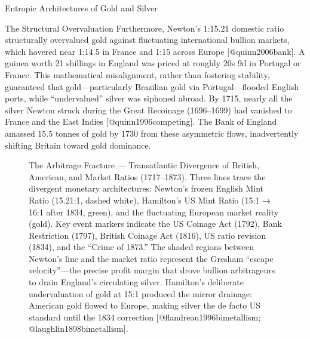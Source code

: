 \documentclass[
  ignorenonframetext,
]{beamer}
\makeatletter
\newcommand*\pandocbounded[1]{%
  \sbox\pandoc@box{#1}%
  \Gscale@div\@tempa{\textheight}{\dimexpr\ht\pandoc@box+\dp\pandoc@box\relax}%
  \Gscale@div\@tempb{\linewidth}{\wd\pandoc@box}%
  \ifdim\@tempb\p@<\@tempa\p@\let\@tempa\@tempb\fi%
  \ifdim\@tempa\p@<\p@\scalebox{\@tempa}{\usebox\pandoc@box}%
  \else\usebox{\pandoc@box}%
  \fi%
}
\makeatother
\begin{document}
\begin{frame}{Entropic Architectures of Gold and Silver}
\begin{block}{The Structural Overvaluation}
\protect{}\label{the-structural-overvaluation}
Furthermore, Newton's 1:15.21 domestic ratio structurally overvalued
gold against fluctuating international bullion markets, which hovered
near 1:14.5 in France and 1:15 across Europe {[}@quinn2006bank{]}. A
guinea worth 21 shillings in England was priced at roughly 20s 9d in
Portugal or France. This mathematical misalignment, rather than
fostering stability, guaranteed that gold---particularly Brazilian gold
via Portugal---flooded English ports, while ``undervalued'' silver was
siphoned abroad. By 1715, nearly all the silver Newton struck during the
Great Recoinage (1696--1699) had vanished to France and the East Indies
{[}@quinn1996competing{]}. The Bank of England amassed 15.5 tonnes of
gold by 1730 from these asymmetric flows, inadvertently shifting Britain
toward gold dominance.

\begin{figure}
\centering
\pandocbounded{\includegraphics[keepaspectratio,alt={The Arbitrage Fracture --- Transatlantic Divergence of British, American, and Market Ratios (1717--1873). Three lines trace the divergent monetary architectures: Newton's frozen English Mint Ratio (15.21:1, dashed white), Hamilton's US Mint Ratio (15:1 → 16:1 after 1834, green), and the fluctuating European market reality (gold). Key event markers indicate the US Coinage Act (1792), Bank Restriction (1797), British Coinage Act (1816), US ratio revision (1834), and the ``Crime of 1873.'' The shaded regions between Newton's line and the market ratio represent the Gresham ``escape velocity''---the precise profit margin that drove bullion arbitrageurs to drain England's circulating silver. Hamilton's deliberate undervaluation of gold at 15:1 produced the mirror drainage: American gold flowed to Europe, making silver the de facto US standard until the 1834 correction {[}@flandreau1996bimetallism; @laughlin1898bimetallism{]}.}]{../output/figures/historic_ratio.png}}
\caption{The Arbitrage Fracture --- Transatlantic Divergence of British,
American, and Market Ratios (1717--1873). Three lines trace the
divergent monetary architectures: Newton's frozen English Mint Ratio
(15.21:1, dashed white), Hamilton's US Mint Ratio (15:1 → 16:1 after
1834, green), and the fluctuating European market reality (gold). Key
event markers indicate the US Coinage Act (1792), Bank Restriction
(1797), British Coinage Act (1816), US ratio revision (1834), and the
``Crime of 1873.'' The shaded regions between Newton's line and the
market ratio represent the Gresham ``escape velocity''---the precise
profit margin that drove bullion arbitrageurs to drain England's
circulating silver. Hamilton's deliberate undervaluation of gold at 15:1
produced the mirror drainage: American gold flowed to Europe, making
silver the de facto US standard until the 1834 correction
{[}@flandreau1996bimetallism;
@laughlin1898bimetallism{]}.}\label{fig-historic-ratio}
\end{figure}
\end{block}


\end{frame}
\end{document}
